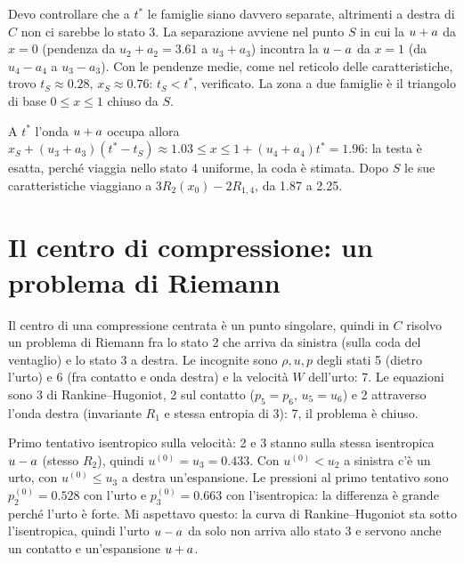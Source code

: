 Devo controllare che a $t^*$ le famiglie siano davvero separate, altrimenti a destra di $C$ non ci sarebbe lo
stato 3. La separazione avviene nel punto $S$ in cui la $u+a$ da $x=0$ (pendenza da $u_2+a_2=\num{3.61}$ a
$u_3+a_3$) incontra la $u-a$ da $x=1$ (da $u_4-a_4$ a $u_3-a_3$). Con le pendenze medie, come nel reticolo delle
caratteristiche, trovo $t_S\approx\num{0.28}$, $x_S\approx\num{0.76}$: $t_S<t^*$, verificato. La zona a due
famiglie è il triangolo di base $0\le x\le1$ chiuso da $S$.

A $t^*$ l'onda $u+a$ occupa allora $x_S+(u_3+a_3)(t^*-t_S)\approx\num{1.03}\le x\le1+(u_4+a_4)t^*=\num{1.96}$:
la testa è esatta, perché viaggia nello stato 4 uniforme, la coda è stimata. Dopo $S$ le sue caratteristiche
viaggiano a $3R_2(x_0)-2R_{1,4}$, da \num{1.87} a \num{2.25}.

\section*{Il centro di compressione: un problema di Riemann}
Il centro di una compressione centrata è un punto singolare, quindi in $C$ risolvo un problema di Riemann fra lo
stato 2 che arriva da sinistra (sulla coda del ventaglio) e lo stato 3 a destra. Le incognite sono $\rho,u,p$ degli
stati 5 (dietro l'urto) e 6 (fra contatto e onda destra) e la velocità $W$ dell'urto: 7. Le equazioni sono 3 di
Rankine--Hugoniot, 2 sul contatto ($p_5=p_6$, $u_5=u_6$) e 2 attraverso l'onda destra (invariante $R_1$ e stessa
entropia di 3): 7, il problema è chiuso.

Primo tentativo isentropico sulla velocità: 2 e 3 stanno sulla stessa isentropica $u-a$ (stesso $R_2$), quindi
$u^{(0)}=u_3=\num{0.433}$. Con $u^{(0)}<u_2$ a sinistra c'è un urto, con $u^{(0)}\le u_3$ a destra
un'espansione. Le pressioni al primo tentativo sono $p_2^{(0)}=\num{0.528}$ con l'urto e $p_3^{(0)}=\num{0.663}$
con l'isentropica: la differenza è grande perché l'urto è forte. Mi aspettavo questo: la curva di
Rankine--Hugoniot sta sotto l'isentropica, quindi l'urto $u-a$ da solo non arriva allo stato 3 e servono anche
un contatto e un'espansione $u+a$.


